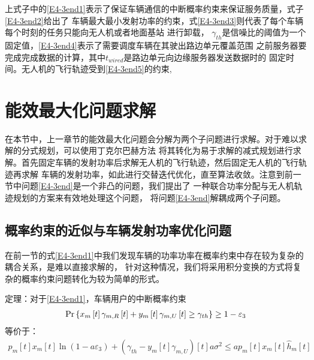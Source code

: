 上式子中的\eqref{E4-3end1}表示了保证车辆通信的中断概率约束来保证服务质量，式子\eqref{E4-3end2}给出了
车辆最大最小发射功率的约束，式\eqref{E4-3end3}则代表了每个车辆每个时刻的任务只能向无人机或者地面基站
进行卸载，
 $\gamma_{th}$是信噪比的阈值为一个固定值，\eqref{E4-3end4}表示了需要调度车辆在其驶出路边单元覆盖范围
之前服务器要完成完成数据的计算，其中$t_{wired}$是路边单元向边缘服务器发送数据时的
固定时间。无人机的飞行轨迹受到\eqref{E4-3end5}的约束,


\section{能效最大化问题求解}\label{section4-3}
在本节中，上一章节的能效最大化问题会分解为两个子问题进行求解。对于难以求解的分式规划，可以使用丁克尔巴赫方法
将其转化为易于求解的减式规划进行求解。首先固定车辆的发射功率后求解无人机的飞行轨迹，然后固定无人机的飞行轨迹再求解
车辆的发射功率，如此进行交替迭代优化，直至算法收敛。注意到前一节中问题\eqref{E4-3end}是一个非凸的问题，我们提出了
一种联合功率分配与无人机轨迹规划的方案来有效地处理这个问题，
将问题\eqref{E4-3end}解耦成两个子问题。
\subsection{概率约束的近似与车辆发射功率优化问题}\label{section4-3-1}
在前一节的式\eqref{E4-3end1}中我们发现车辆的功率功率在概率约束中存在较为复杂的耦合关系，是难以直接求解的，
针对这种情况，我们将采用积分变换的方式将复杂的概率约束问题转化为较为简单的形式。

定理：对于\eqref{E4-3end1}，车辆用户的中断概率约束
\begin{align}
\Pr\left\{x_m\left[t\right]\gamma_{m,R}\left[t\right]+y_m\left[t\right]\gamma_{m,U}\left[t\right] \geq \gamma_{th}\right\}\geq1-\varepsilon_3    \notag
\end{align}
等价于：
\begin{equation} \label{E4-13}
\begin{gathered}
p_m\left[t\right]x_m\left[t\right]\ln \left(1-a \varepsilon_3\right)+(\gamma_{th}-y_m\left[t\right]\gamma_{m,U})\left[t\right] a \sigma^2
\leq a p_m\left[t\right]x_m\left[t\right]\hat{h}_{m}\left[t\right]
\end{gathered}
\end{equation}

